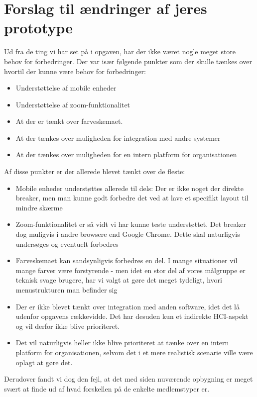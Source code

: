 \section{Forslag til ændringer af jeres prototype}

Ud fra de ting vi har set på i opgaven, har der ikke været nogle meget store
behov for forbedringer. Der var især følgende punkter som der skulle tænkes over
hvortil der kunne være behov for forbedringer:

\begin{itemize}
\item Understøttelse af mobile enheder
\item Understøttelse af zoom-funktionalitet
\item At der er tænkt over farveskemaet.
\item At der tænkes over muligheden for integration med andre systemer
\item At der tænkes over muligheden for en intern platform for organisationen
\end{itemize}

Af disse punkter er der allerede blevet tænkt over de fleste:
\begin{itemize}
\item Mobile enheder understøttes allerede til dels: Der er ikke noget der
direkte breaker, men man kunne godt forbedre det ved at lave et specifikt layout
til mindre skærme
\item Zoom-funktionalitet er så vidt vi har kunne teste understøttet. Det
breaker dog muligvis i andre browsere end Google Chrome. Dette skal naturligvis
undersøges og eventuelt forbedres
\item Farveskemaet kan sandsynligvis forbedres en del. I mange situationer vil
mange farver være forstyrende - men idet en stor del af vores målgruppe er
teknisk svage brugere, har vi valgt at gøre det meget tydeligt, hvori
menustrukturen man befinder sig
\item Der er ikke blevet tænkt over integration med anden software, idet det
lå udenfor opgavens rækkevidde. Det har desuden kun et indirekte HCI-aspekt og
vil derfor ikke blive prioriteret.
\item Det vil naturligvis heller ikke blive prioriteret at tænke over en intern
platform for organisationen, selvom det i et mere realistisk scenarie ville være
oplagt at gøre det.
\end{itemize}

Derudover fandt vi dog den fejl, at det med siden nuværende opbygning er meget
svært at finde ud af hvad forskellen på de enkelte medlemstyper er.
